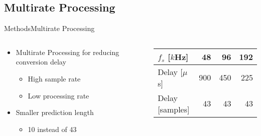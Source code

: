 \subsection{Multirate Processing}
\begin{frame}{Methods}{Multirate Processing}	
\begin{columns}
	\begin{column}{0.5\textwidth}
		\begin{itemize}
			\item Multirate Processing for reducing conversion delay
			\begin{itemize}
				\item High sample rate
				\item Low processing rate
			\end{itemize}
			\item Smaller prediction length
			\begin{itemize}
				\item 10 instead of 43
			\end{itemize}
		\end{itemize}
	\end{column}
	\begin{column}{0.5\textwidth} 
		\begin{table}[H]
			\centering
			\begin{tabular}{|l|r|r|r|}
				\hline
				$f_s$ {[}$k$Hz{]} & 48 & 96 & 192 \\ \hline
				Delay {[}$\mu$s{]} & 900 & 450 & 225 \\ \hline
				Delay {[}samples{]} & 43 & 43 & 43 \\ \hline
			\end{tabular}
		\end{table}
	\end{column}
\end{columns}
\end{frame}




